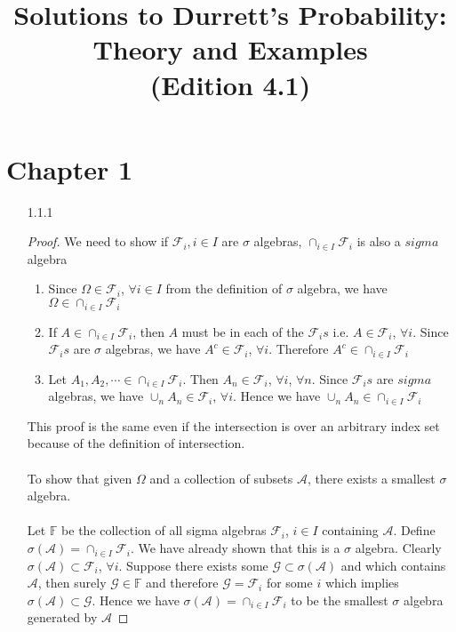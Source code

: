 \documentclass[a4paper,english,10pt]{article}
\title{Solutions to Durrett's Probability: Theory and Examples \\(Edition 4.1)}
\date{}
\begin{document}
\maketitle
\section*{Chapter 1}
\begin{enumerate}
\item[1.1.1]
\begin{proof} 
We need to show if $\mathcal{F}_i, i\in I$ are $\sigma$ algebras, $\cap_{i \in I} \mathcal{F}_i$ is also a $sigma$ algebra
\begin{enumerate}
\item Since $\Omega \in \mathcal{F}_i$, $ \forall i\in I$  from the definition of $\sigma$ algebra, we have
$\Omega \in \cap_{i \in I} \mathcal{F}_i$
\item If $A\in \cap_{i \in I} \mathcal{F}_i$, then $A$ must be in each of the $\mathcal{F}_is$ i.e. 
$A\in \mathcal{F}_i$, $ \forall i$. Since $\mathcal{F}_is$ are $\sigma$ algebras, we have $A^c \in \mathcal{F}_i$, $ \forall i$. Therefore $A^c \in \cap_{i \in I} \mathcal{F}_i$
\item Let $A_1,A_2,\cdots \in \cap_{i \in I} \mathcal{F}_i$. Then $A_n \in \mathcal{F}_i$, $\forall i$, $\forall n$. Since $\mathcal{F}_is$ are $sigma$ algebras, we have $\cup_n A_n \in \mathcal{F}_i $, $\forall i$. Hence we have $\cup_n A_n \in  \cap_{i \in I} \mathcal{F}_i$
\end{enumerate}
This proof is the same even if the intersection is over an arbitrary index set because of the definition of intersection.
\\\\
To show that given $\Omega$ and a collection of subsets
$\mathcal{A}$, there exists a smallest $\sigma$ algebra.\\\\
Let $\mathbb{F}$ be the collection of all sigma algebras $\mathcal{F}_i$, $i\in I$ containing $\mathcal{A}$. Define $\sigma(\mathcal{A})=\cap_{i \in I} \mathcal{F}_i$. We have already shown that this is a $\sigma$ algebra. Clearly $\sigma(\mathcal{A}) \subset \mathcal{F}_i$, $\forall i$. Suppose there exists some $\mathcal{G} \subset \sigma(\mathcal{A})$ and which contains $\mathcal{A}$, then surely $\mathcal{G}\in \mathbb{F}$ and therefore $\mathcal{G}=\mathcal{F}_i$ for some $i$ which implies $\sigma(\mathcal{A}) \subset \mathcal{G}$. Hence we have $\sigma(\mathcal{A})=\cap_{i \in I} \mathcal{F}_i$ to be the smallest $\sigma$ algebra generated by $\mathcal{A}$


\end{proof}
\end{enumerate}
\end{document}
